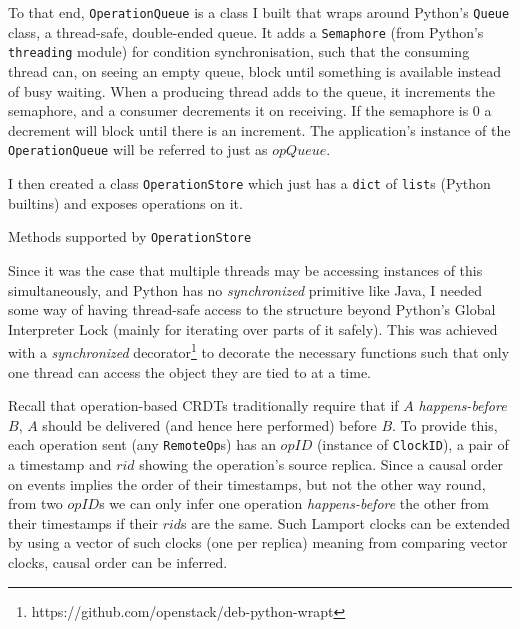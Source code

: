 \documentclass[diss.tex]{subfiles}
\begin{document}

To that end, \texttt{OperationQueue} is a class I built that wraps around Python's \texttt{Queue} class, a thread-safe, double-ended queue. It adds a \texttt{Semaphore} (from Python's \texttt{threading} module) for condition synchronisation, such that the consuming thread can, on seeing an empty queue, block until something is available instead of busy waiting. When a producing thread adds to the queue, it increments the semaphore, and a consumer decrements it on receiving. If the semaphore is 0 a decrement will block until there is an increment. The application's instance of the \texttt{OperationQueue} will be referred to just as $opQueue$.

I then created a class \texttt{OperationStore} which just has a \texttt{dict} of \texttt{list}s (Python builtins) and exposes operations on it.

\begin{algorithm}[H]
\caption*{Methods supported by \texttt{OperationStore}}
\begin{algorithmic}[1]
 
\EndFunction
{} 
\EndFunction
\end{algorithmic}
\end{algorithm}

Since it was the case that multiple threads may be accessing instances of this simultaneously, and Python has no \textit{synchronized} primitive like Java, I needed some way of having thread-safe access to the structure beyond Python's Global Interpreter Lock (mainly for iterating over parts of it safely). This was achieved with a \textit{synchronized} decorator\footnote{https://github.com/openstack/deb-python-wrapt} to decorate the necessary functions such that only one thread can access the object they are tied to at a time.

Recall that operation-based CRDTs traditionally require that if $A$ \textit{happens-before} $B$, $A$ should be delivered (and hence here performed) before $B$. To provide this, each operation sent (any \texttt{RemoteOp}s) has an $opID$ (instance of \texttt{ClockID}), a pair of a timestamp and $rid$ showing the operation's source replica. Since a causal order on events implies the order of their timestamps, but not the other way round, from two $opID$s we can only infer one operation \textit{happens-before} the other from their timestamps if their $rid$s are the same. Such Lamport clocks \cite{lamportshappensbefore} can be extended by using a vector of such clocks (one per replica) meaning from comparing vector clocks, causal order can be inferred.
\end{document}
